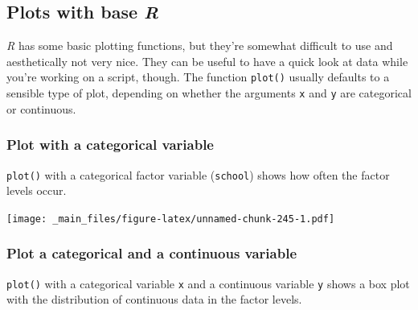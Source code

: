\documentclass[
]{scrartcl}
\newenvironment{Shaded}{\begin{snugshade}}{\end{snugshade}}
\newcommand{\AttributeTok}[1]{\textcolor[rgb]{0.13,0.29,0.53}{#1}}
\newcommand{\FunctionTok}[1]{\textcolor[rgb]{0.13,0.29,0.53}{\textbf{#1}}}
\newcommand{\NormalTok}[1]{#1}
\newcommand{\SpecialCharTok}[1]{\textcolor[rgb]{0.81,0.36,0.00}{\textbf{#1}}}
\begin{document}
\subsection{\texorpdfstring{Plots with base \emph{R}}{Plots with base R}}\label{plots-with-base-r}

\emph{R} has some basic plotting functions, but they're somewhat difficult to use and aesthetically not very nice. They can be useful to have a quick look at data while you're working on a script, though. The function \texttt{plot()} usually defaults to a sensible type of plot, depending on whether the arguments \texttt{x} and \texttt{y} are categorical or continuous.

\subsubsection{Plot with a categorical variable}\label{plot-with-a-categorical-variable}

\texttt{plot()} with a categorical factor variable (\texttt{school}) shows how often the factor levels occur.

\begin{Shaded}
\end{Shaded}

\texttt{[image: \_main\_files/figure-latex/unnamed-chunk-245-1.pdf]}

\subsubsection{Plot a categorical and a continuous variable}\label{plot-a-categorical-and-a-continuous-variable}

\texttt{plot()} with a categorical variable \texttt{x} and a continuous variable \texttt{y} shows a box plot with the distribution of continuous data in the factor levels.

\begin{Shaded}
\end{Shaded}
\end{document}
